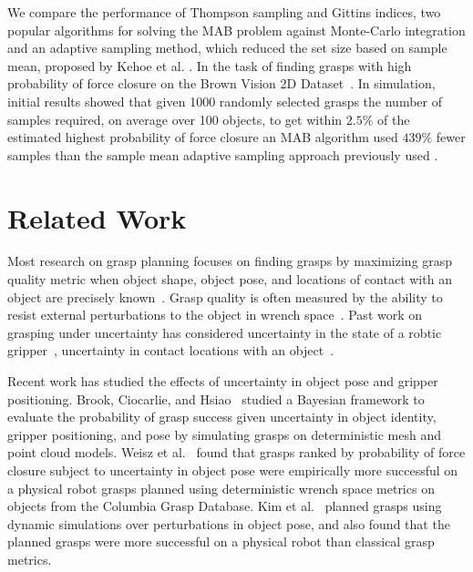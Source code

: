\documentclass[10pt, conference]{ieeeconf}      %
\begin{document}
We compare the performance of Thompson sampling and Gittins indices, two popular algorithms for solving the MAB problem against Monte-Carlo integration and an adaptive sampling method, which reduced the set size based on sample mean, proposed by Kehoe et al. \cite{kehoe2012toward}. In the task of finding grasps with high probability of force closure on the Brown Vision 2D Dataset~\cite{brown, christopoulos2007handling}.
In simulation, initial results  showed that given 1000 randomly selected grasps the number of samples required, on average over 100 objects, to get within $2.5\%$ of the estimated highest probability of force closure an MAB algorithm used $439\%$ fewer samples than the sample mean adaptive sampling approach previously used .


\section{Related Work}

Most research on grasp planning focuses on finding grasps by maximizing grasp quality metric when object shape, object pose, and locations of contact with an object are precisely known~\cite{cheong2011output, ciocarlie2009}.
Grasp quality is often measured by the ability to resist external perturbations to the object in wrench space~\cite{ferrari1992, miller2004graspit}.
Past work on grasping under uncertainty has considered uncertainty in the state of a robtic gripper~\cite{goldberg1990bayesian, stulp2011learning}, uncertainty in contact locations with an object~\cite{zheng2005}.

Recent work has studied the effects of uncertainty in object pose and gripper positioning.%
Brook, Ciocarlie, and Hsiao~\cite{brook2011collaborative, hsiao2011bayesian} studied a Bayesian framework to evaluate the probability of grasp success given uncertainty in object identity, gripper positioning, and pose by simulating grasps on deterministic mesh and point cloud models.
Weisz et al.~\cite{weisz2012pose} found that grasps ranked by probability of force closure subject to uncertainty in object pose were empirically more successful on a physical robot grasps planned using deterministic wrench space metrics on objects from the Columbia Grasp Database.
Kim et al.~\cite{kim2012physically} planned grasps using dynamic simulations over perturbations in object pose, and also found that the planned grasps were more successful on a physical robot than classical grasp metrics.
\end{document}
